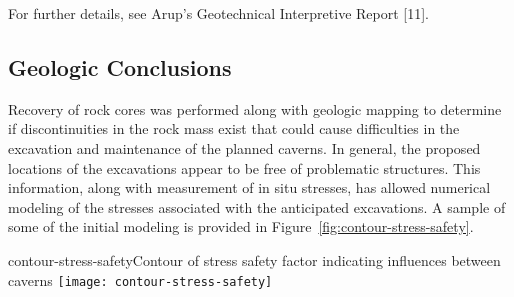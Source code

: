 For further details, see Arup's Geotechnical Interpretive Report [11]. 

\subsection{Geologic Conclusions}
\label{sec:fscf-site-cond-geo-concl}

Recovery of rock cores was performed along with geologic mapping to determine if discontinuities in the rock mass exist that could cause difficulties in the %
excavation and maintenance of the planned caverns. In general, the proposed locations of the excavations %
appear to be free of problematic structures. This information, along with measurement of in situ stresses, has allowed numerical modeling of the stresses associated with the anticipated excavations. A sample of some of the initial modeling %
is provided in Figure~\ref{fig:contour-stress-safety}.

\begin{cdrfigure}{contour-stress-safety}{Contour of stress safety factor indicating influences between caverns}
\texttt{[image: contour-stress-safety]}
\end{cdrfigure}


